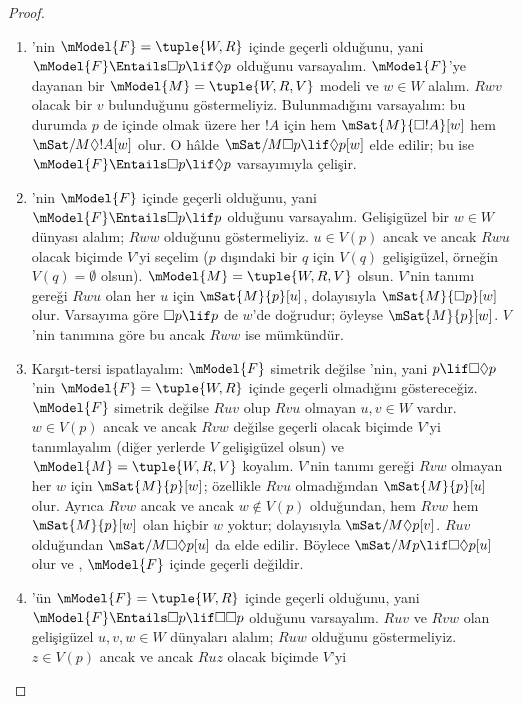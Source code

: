 \begin{proof}
  \begin{enumerate}
  \item {}'nin $\mModel{F}=\tuple{W,R}$ içinde geçerli olduğunu, yani
    $\mModel{F}\Entails\Box p\lif\Diamond p$ olduğunu varsayalım.
    $\mModel{F}$'ye dayanan bir $\mModel{M}=\tuple{W,R,V}$ modeli ve
    $w\in W$ alalım. $Rwv$ olacak bir $v$ bulunduğunu göstermeliyiz.
    Bulunmadığını varsayalım: bu durumda $p$ de içinde olmak üzere her $!A$
    için hem $\mSat{M}{\Box !A}[w]$ hem $\mSat/{M}{\Diamond !A}[w]$ olur.
    O hâlde $\mSat/{M}{\Box p\lif\Diamond p}[w]$ elde edilir; bu ise
    $\mModel{F}\Entails\Box p\lif\Diamond p$ varsayımıyla çelişir.
  \item {}'nin $\mModel{F}$ içinde geçerli olduğunu, yani
    $\mModel{F}\Entails\Box p\lif p$ olduğunu varsayalım. Gelişigüzel bir
    $w\in W$ dünyası alalım; $Rww$ olduğunu göstermeliyiz. $u\in V(p)$
    ancak ve ancak $Rwu$ olacak biçimde $V$'yi seçelim ($p$ dışındaki bir
    $q$ için $V(q)$ gelişigüzel, örneğin $V(q)=\emptyset$ olsun).
    $\mModel{M}=\tuple{W,R,V}$ olsun. $V$'nin tanımı gereği $Rwu$ olan her
    $u$ için $\mSat{M}{p}[u]$, dolayısıyla $\mSat{M}{\Box p}[w]$ olur.
    Varsayıma göre $\Box p\lif p$ de $w$'de doğrudur; öyleyse
    $\mSat{M}{p}[w]$. $V$'nin tanımına göre bu ancak $Rww$ ise mümkündür.
  \item Karşıt-tersi ispatlayalım: $\mModel{F}$ simetrik değilse 'nin,
    yani $p\lif\Box\Diamond p$'nin
    $\mModel{F}=\tuple{W,R}$ içinde geçerli olmadığını göstereceğiz.
    $\mModel{F}$ simetrik değilse $Ruv$ olup $Rvu$ olmayan $u,v\in W$
    vardır. $w\in V(p)$ ancak ve ancak $Rvw$ değilse geçerli olacak biçimde
    $V$'yi tanımlayalım (diğer yerlerde $V$ gelişigüzel olsun) ve
    $\mModel{M}=\tuple{W,R,V}$ koyalım. $V$'nin tanımı gereği $Rvw$
    olmayan her $w$ için $\mSat{M}{p}[w]$; özellikle $Rvu$ olmadığından
    $\mSat{M}{p}[u]$ olur. Ayrıca $Rvw$ ancak ve ancak $w\notin V(p)$
    olduğundan, hem $Rvw$ hem $\mSat{M}{p}[w]$ olan hiçbir $w$ yoktur;
    dolayısıyla $\mSat/{M}{\Diamond p}[v]$. $Ruv$ olduğundan
    $\mSat/{M}{\Box\Diamond p}[u]$ da elde edilir. Böylece
    $\mSat/{M}{p\lif\Box\Diamond p}[u]$ olur ve , $\mModel{F}$
    içinde geçerli değildir.
  \item {}'ün $\mModel{F}=\tuple{W,R}$ içinde geçerli olduğunu, yani
    $\mModel{F}\Entails\Box p\lif\Box\Box p$ olduğunu varsayalım. $Ruv$ ve
    $Rvw$ olan gelişigüzel $u,v,w\in W$ dünyaları alalım; $Ruw$ olduğunu
    göstermeliyiz. $z\in V(p)$ ancak ve ancak $Ruz$ olacak biçimde $V$'yi

\end{enumerate}
\end{proof}

